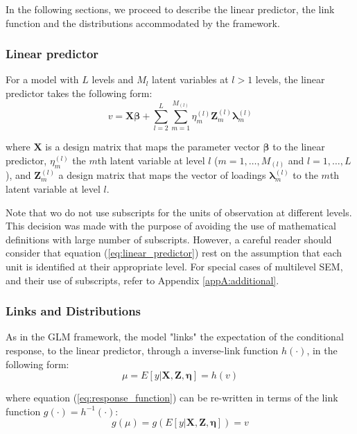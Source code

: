 In the following sections, we proceed to describe the linear predictor, the link function and the distributions accommodated by the framework.


\subsubsection{Linear predictor} \label{ss_sect:linear_predictor}
For a model with $L$ levels and $M_{l}$ latent variables at $l>1$ levels, the linear predictor takes the following form:
\begin{equation} \label{eq:linear_predictor}
	v = \mathbf{X} \pmb{\beta} + \sum_{l=2}^{L} \sum_{m=1}^{M_{(l)}} \eta_{m}^{(l)} \mathbf{Z}_{m}^{(l)} \pmb{\lambda}_{m}^{(l)}
\end{equation}

\noindent where $\mathbf{X}$ is a design matrix that maps the parameter vector $\pmb{\beta}$ to the linear predictor, $\eta_{m}^{(l)}$ the $m$th latent variable at level $l$ ($m=1, \dots, M_{(l)}$ and $l=1, \dots, L$), and $\mathbf{Z}_{m}^{(l)}$ a design matrix that maps the vector of loadings $\pmb{\lambda}_{m}^{(l)}$ to the $m$th latent variable at level $l$.

Note that wo do not use subscripts for the units of observation at different levels. This decision was made with the purpose of avoiding the use of mathematical definitions with large number of subscripts. However, a careful reader should consider that equation (\ref{eq:linear_predictor}) rest on the assumption that each unit is identified at their appropriate level. For special cases of multilevel SEM, and their use of subscripts, refer to Appendix \ref{appA:additional}.

\subsubsection{Links and Distributions} \label{ss_sect:link_dist}
As in the GLM framework, the model "links" the expectation of the conditional response, to the linear predictor, through a inverse-link function $h(\cdot)$, in the following form: 
\begin{equation} \label{eq:response_function}
	\mu = E[y | \mathbf{X}, \mathbf{Z}, \pmb{\eta}] = h(v)
\end{equation}

\noindent where equation (\ref{eq:response_function}) can be re-written in terms of the link function $g(\cdot) = h^{-1}(\cdot)$:
\begin{equation} \label{eq:link_function}
	g(\mu) = g(E[y | \mathbf{X}, \mathbf{Z}, \pmb{\eta}]) = v
\end{equation}

